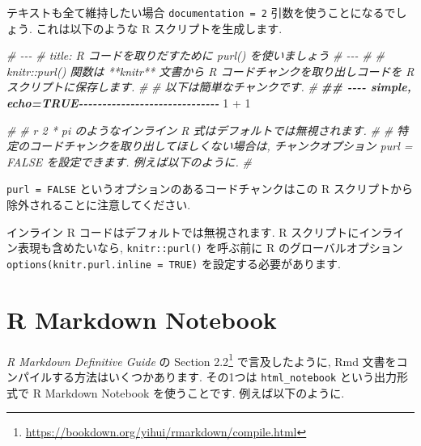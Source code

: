 \documentclass[
  11pt,
]{bxjsreport}
\newenvironment{Shaded}{\begin{snugshade}}{\end{snugshade}}
\newcommand{\CommentTok}[1]{\textcolor[rgb]{0.56,0.35,0.01}{\textit{#1}}}
\newcommand{\DecValTok}[1]{\textcolor[rgb]{0.00,0.00,0.81}{#1}}
\newcommand{\DocumentationTok}[1]{\textcolor[rgb]{0.56,0.35,0.01}{\textbf{\textit{#1}}}}
\newcommand{\SpecialCharTok}[1]{\textcolor[rgb]{0.00,0.00,0.00}{#1}}
\renewcommand{\href}[2]{#2\footnote{\url{#1}}}
\begin{document}
テキストも全て維持したい場合 \texttt{documentation = 2} 引数を使うことになるでしょう. これは以下のような R スクリプトを生成します.

\begin{Shaded}
\begin{Highlighting}[]
\CommentTok{\#\textquotesingle{} {-}{-}{-}}
\CommentTok{\#\textquotesingle{} title: R コードを取りだすために \textasciigrave{}purl()\textasciigrave{} を使いましょう}
\CommentTok{\#\textquotesingle{} {-}{-}{-}}
\CommentTok{\#\textquotesingle{} }
\CommentTok{\#\textquotesingle{} \textasciigrave{}knitr::purl()\textasciigrave{} 関数は **knitr** 文書から  R コードチャンクを取り出しコードを R スクリプトに保存します.}
\CommentTok{\#\textquotesingle{} }
\CommentTok{\#\textquotesingle{} 以下は簡単なチャンクです.}
\CommentTok{\#\textquotesingle{} }
\DocumentationTok{\#\# {-}{-}{-}{-} simple, echo=TRUE{-}{-}{-}{-}{-}{-}{-}{-}{-}{-}{-}{-}{-}{-}{-}{-}{-}{-}{-}{-}{-}{-}{-}{-}{-}{-}{-}{-}{-}{-}}
\DecValTok{1} \SpecialCharTok{+} \DecValTok{1}

\CommentTok{\#\textquotesingle{} }
\CommentTok{\#\textquotesingle{} \textasciigrave{}r 2 * pi\textasciigrave{} のようなインライン R 式はデフォルトでは無視されます.}
\CommentTok{\#\textquotesingle{} }
\CommentTok{\#\textquotesingle{} 特定のコードチャンクを取り出してほしくない場合は, チャンクオプション \textasciigrave{}purl = FALSE\textasciigrave{} を設定できます. 例えば以下のように.}
\CommentTok{\#\textquotesingle{} }
\end{Highlighting}
\end{Shaded}

\texttt{purl = FALSE} というオプションのあるコードチャンクはこの R スクリプトから除外されることに注意してください.

インライン R コードはデフォルトでは無視されます. R スクリプトにインライン表現も含めたいなら, \texttt{knitr::purl()} を呼ぶ前に R のグローバルオプション \texttt{options(knitr.purl.inline = TRUE)} を設定する必要があります.

\hypertarget{notebook}{%
\section{R Markdown Notebook}\label{notebook}}

\emph{R Markdown Definitive Guide} \autocite{rmarkdown2018} の \href{https://bookdown.org/yihui/rmarkdown/compile.html}{Section 2.2} で言及したように, Rmd 文書をコンパイルする方法はいくつかあります. その1つは \texttt{html\_notebook} という出力形式で R Markdown Notebook を使うことです. 例えば以下のように.
\end{document}
